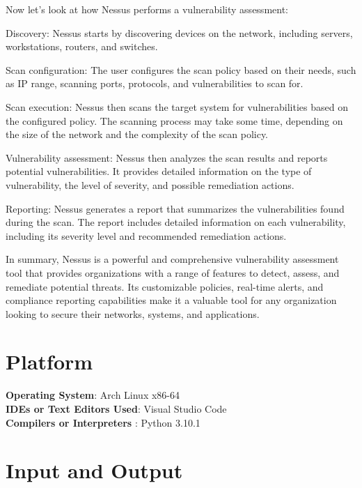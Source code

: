 \documentclass[11pt]{article}
\begin{document}
Now let's look at how Nessus performs a vulnerability assessment:

Discovery: Nessus starts by discovering devices on the network, including servers, workstations, routers, and switches.

Scan configuration: The user configures the scan policy based on their needs, such as IP range, scanning ports, protocols, and vulnerabilities to scan for.

Scan execution: Nessus then scans the target system for vulnerabilities based on the configured policy. The scanning process may take some time, depending on the size of the network and the complexity of the scan policy.

Vulnerability assessment: Nessus then analyzes the scan results and reports potential vulnerabilities. It provides detailed information on the type of vulnerability, the level of severity, and possible remediation actions.

Reporting: Nessus generates a report that summarizes the vulnerabilities found during the scan. The report includes detailed information on each vulnerability, including its severity level and recommended remediation actions.

In summary, Nessus is a powerful and comprehensive vulnerability assessment tool that provides organizations with a range of features to detect, assess, and remediate potential threats. Its customizable policies, real-time alerts, and compliance reporting capabilities make it a valuable tool for any organization looking to secure their networks, systems, and applications.


\section{Platform}
\textbf{\textbf{Operating System}}: Arch Linux x86-64 \\
\textbf{\textbf{IDEs or Text Editors Used}}: Visual Studio Code\\
\textbf{\textbf{Compilers or Interpreters} }: Python 3.10.1\\

\section{Input and Output}

\begin{verbatim}
\end{verbatim}


% 
\end{document}

